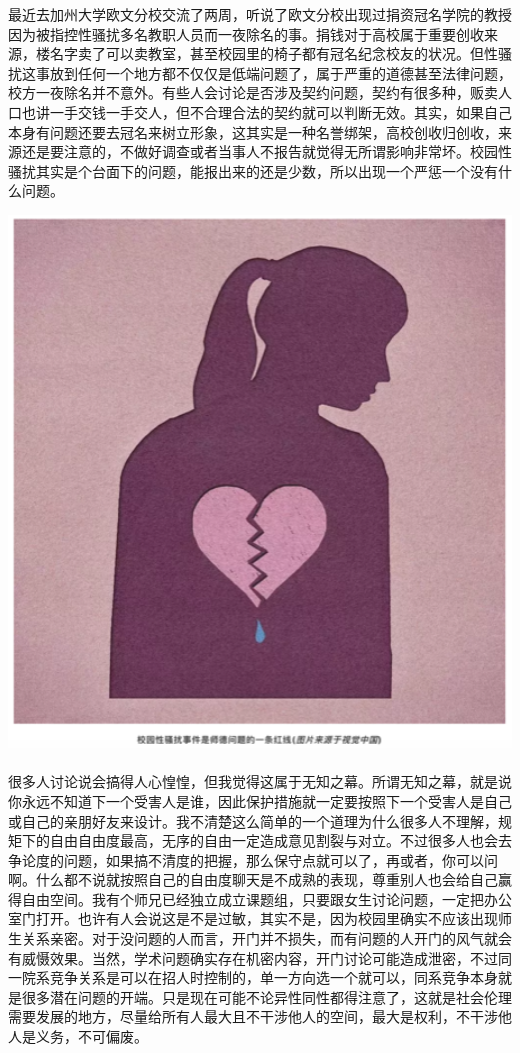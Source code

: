 \documentclass[]{book}
\begin{document}
最近去加州大学欧文分校交流了两周，听说了欧文分校出现过捐资冠名学院的教授因为被指控性骚扰多名教职人员而一夜除名的事。捐钱对于高校属于重要创收来源，楼名字卖了可以卖教室，甚至校园里的椅子都有冠名纪念校友的状况。但性骚扰这事放到任何一个地方都不仅仅是低端问题了，属于严重的道德甚至法律问题，校方一夜除名并不意外。有些人会讨论是否涉及契约问题，契约有很多种，贩卖人口也讲一手交钱一手交人，但不合理合法的契约就可以判断无效。其实，如果自己本身有问题还要去冠名来树立形象，这其实是一种名誉绑架，高校创收归创收，来源还是要注意的，不做好调查或者当事人不报告就觉得无所谓影响非常坏。校园性骚扰其实是个台面下的问题，能报出来的还是少数，所以出现一个严惩一个没有什么问题。

\includegraphics[width=6.24in]{images/wuzhi1}

很多人讨论说会搞得人心惶惶，但我觉得这属于无知之幕。所谓无知之幕，就是说你永远不知道下一个受害人是谁，因此保护措施就一定要按照下一个受害人是自己或自己的亲朋好友来设计。我不清楚这么简单的一个道理为什么很多人不理解，规矩下的自由自由度最高，无序的自由一定造成意见割裂与对立。不过很多人也会去争论度的问题，如果搞不清度的把握，那么保守点就可以了，再或者，你可以问啊。什么都不说就按照自己的自由度聊天是不成熟的表现，尊重别人也会给自己赢得自由空间。我有个师兄已经独立成立课题组，只要跟女生讨论问题，一定把办公室门打开。也许有人会说这是不是过敏，其实不是，因为校园里确实不应该出现师生关系亲密。对于没问题的人而言，开门并不损失，而有问题的人开门的风气就会有威慑效果。当然，学术问题确实存在机密内容，开门讨论可能造成泄密，不过同一院系竞争关系是可以在招人时控制的，单一方向选一个就可以，同系竞争本身就是很多潜在问题的开端。只是现在可能不论异性同性都得注意了，这就是社会伦理需要发展的地方，尽量给所有人最大且不干涉他人的空间，最大是权利，不干涉他人是义务，不可偏废。
\end{document}
